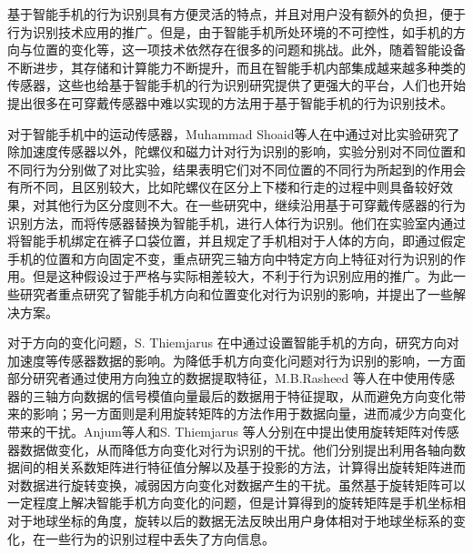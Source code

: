 \par 基于智能手机的行为识别具有方便灵活的特点，并且对用户没有额外的负担，便于行为识别技术应用的推广。但是，由于智能手机所处环境的不可控性，如手机的方向与位置的变化等，这一项技术依然存在很多的问题和挑战。此外，随着智能设备不断进步，其存储和计算能力不断提升，而且在智能手机内部集成越来越多种类的传感器，这些也给基于智能手机的行为识别研究提供了更强大的平台，人们也开始提出很多在可穿戴传感器中难以实现的方法用于基于智能手机的行为识别技术。
\par 对于智能手机中的运动传感器，Muhammad Shoaid等人在\cite{diffSensors}中通过对比实验研究了除加速度传感器以外，陀螺仪和磁力计对行为识别的影响，实验分别对不同位置和不同行为分别做了对比实验，结果表明它们对不同位置的不同行为所起到的作用会有所不同，且区别较大，比如陀螺仪在区分上下楼和行走的过程中则具备较好效果，对其他行为区分度则不大。在一些研究中，继续沿用基于可穿戴传感器的行为识别方法，而将传感器替换为智能手机，进行人体行为识别。他们在实验室内通过将智能手机绑定在裤子口袋位置，并且规定了手机相对于人体的方向，即通过假定手机的位置和方向固定不变，重点研究三轴方向中特定方向上特征对行为识别的作用。但是这种假设过于严格与实际相差较大，不利于行为识别应用的推广。为此一些研究者重点研究了智能手机方向和位置变化对行为识别的影响，并提出了一些解决方案。
\par 对于方向的变化问题，S. Thiemjarus 在\cite{orientationProblem}中通过设置智能手机的方向，研究方向对加速度等传感器数据的影响。为降低手机方向变化问题对行为识别的影响，一方面部分研究者通过使用方向独立的数据提取特征，M.B.Rasheed 等人在\cite{fixOrientationData}中使用传感器的三轴方向数据的信号模值向量最后的数据用于特征提取，从而避免方向变化带来的影响；另一方面则是利用旋转矩阵的方法作用于数据向量，进而减少方向变化带来的干扰。Anjum等人和S. Thiemjarus 等人分别在\cite{orientationTransation1}\cite{orientationTransation2}中提出使用旋转矩阵对传感器数据做变化，从而降低方向变化对行为识别的干扰。他们分别提出利用各轴向数据间的相关系数矩阵进行特征值分解以及基于投影的方法，计算得出旋转矩阵进而对数据进行旋转变换，减弱因方向变化对数据产生的干扰。虽然基于旋转矩阵可以一定程度上解决智能手机方向变化的问题，但是计算得到的旋转矩阵是手机坐标相对于地球坐标的角度，旋转以后的数据无法反映出用户身体相对于地球坐标系的变化，在一些行为的识别过程中丢失了方向信息。
